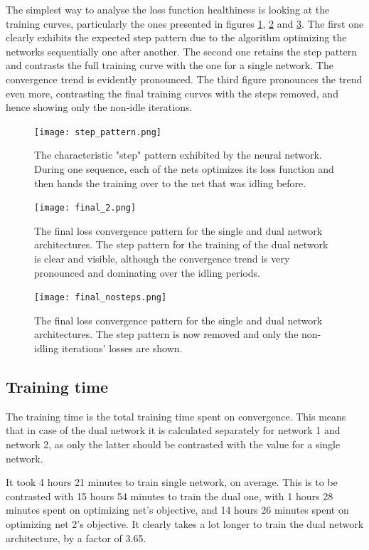 \documentclass[a4paper, 12pt]{article}
\numberwithin{equation}{section}
\begin{document}
	The simplest way to analyse the loss function healthiness is looking at the training curves, particularly the ones presented in figures \ref{fig:step_pattern}, \ref{fig:final_trace} and \ref{fig:final_trace_nosteps}. The first one clearly exhibits the expected step pattern due to the algorithm optimizing the networks sequentially one after another. The second one retains the step pattern and contrasts the full training curve with the one for a single network. The convergence trend is evidently pronounced. The third figure pronounces the trend even more, contrasting the final training curves with the steps removed, and hence showing only the non-idle iterations.
	
	\begin{figure}[!hb]
		\centering
		\texttt{[image: step\_pattern.png]}
		\caption{\label{fig:step_pattern}{The characteristic "step" pattern exhibited by the neural network. During one sequence, each of the nets optimizes its loss function and then hands the training over to the net that was idling before.}}
	\end{figure}
	
	\begin{figure}[!hb]
		\centering
		\texttt{[image: final\_2.png]}
		\caption{\label{fig:final_trace}{The final loss convergence pattern for the single and dual network architectures. The step pattern for the training of the dual network is clear and visible, although the convergence trend is very pronounced and dominating over the idling periods.}}
	\end{figure}
	
	\begin{figure}[!hb]
		\centering
		\texttt{[image: final\_nosteps.png]}
		\caption{\label{fig:final_trace_nosteps}{The final loss convergence pattern for the single and dual network architectures. The step pattern is now removed and only the non-idling iterations' losses are shown.}}
	\end{figure}
	
	\subsection{Training time}
	
	The training time is the total training time spent on convergence. This means that in case of the dual network it is calculated separately for network 1 and network 2, as only the latter should be contrasted with the value for a single network.
	
	It took 4 hours 21 minutes to train single network, on average. This is to be contrasted with 15 hours 54 minutes to train the dual one, with 1 hours 28 minutes spent on optimizing net's objective, and 14 hours 26 minutes spent on optimizing net 2's objective. It clearly takes a lot longer to train the dual network architecture, by a factor of 3.65.
	
\end{document}
